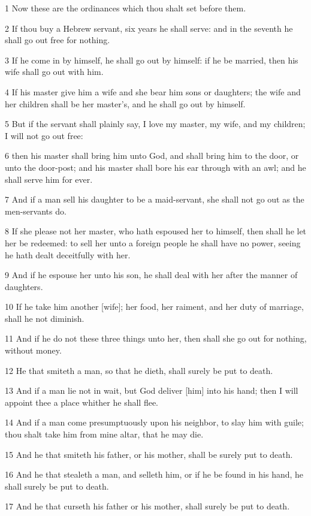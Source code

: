 \par 1 Now these are the ordinances which thou shalt set before them.
\par 2 If thou buy a Hebrew servant, six years he shall serve: and in the seventh he shall go out free for nothing.
\par 3 If he come in by himself, he shall go out by himself: if he be married, then his wife shall go out with him.
\par 4 If his master give him a wife and she bear him sons or daughters; the wife and her children shall be her master's, and he shall go out by himself.
\par 5 But if the servant shall plainly say, I love my master, my wife, and my children; I will not go out free:
\par 6 then his master shall bring him unto God, and shall bring him to the door, or unto the door-post; and his master shall bore his ear through with an awl; and he shall serve him for ever.
\par 7 And if a man sell his daughter to be a maid-servant, she shall not go out as the men-servants do.
\par 8 If she please not her master, who hath espoused her to himself, then shall he let her be redeemed: to sell her unto a foreign people he shall have no power, seeing he hath dealt deceitfully with her.
\par 9 And if he espouse her unto his son, he shall deal with her after the manner of daughters.
\par 10 If he take him another [wife]; her food, her raiment, and her duty of marriage, shall he not diminish.
\par 11 And if he do not these three things unto her, then shall she go out for nothing, without money.
\par 12 He that smiteth a man, so that he dieth, shall surely be put to death.
\par 13 And if a man lie not in wait, but God deliver [him] into his hand; then I will appoint thee a place whither he shall flee.
\par 14 And if a man come presumptuously upon his neighbor, to slay him with guile; thou shalt take him from mine altar, that he may die.
\par 15 And he that smiteth his father, or his mother, shall be surely put to death.
\par 16 And he that stealeth a man, and selleth him, or if he be found in his hand, he shall surely be put to death.
\par 17 And he that curseth his father or his mother, shall surely be put to death.
